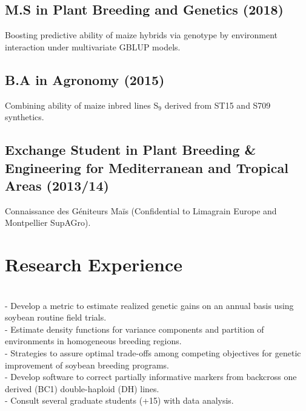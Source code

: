 \documentclass[]{deedy-resume-openfont}
\begin{document}
\begin{minipage}[t]{1\textwidth}
\subsection{M.S in Plant Breeding and Genetics (2018)}
 Boosting predictive ability of maize hybrids via genotype by environment interaction under multivariate GBLUP models.

\sectionsep
\vspace{0.2 mm}

\subsection{B.A in Agronomy (2015)}
 Combining ability of maize inbred lines S$_9$ derived from ST15 and S709 synthetics.

\sectionsep
\vspace{0.2 mm}

\subsection{Exchange Student in Plant Breeding \& Engineering for Mediterranean and Tropical Areas (2013/14)}
 Connaissance des Géniteurs Maïs (Confidential to Limagrain Europe and Montpellier SupAGro).

\sectionsep


\section{Research Experience}

\sectionsep

 \\
- Develop a metric to estimate realized genetic gains on an annual basis using soybean routine field trials. \\
- Estimate density functions for variance components and partition of environments in homogeneous breeding regions.\\
- Strategies to assure optimal trade-offs among competing objectives for genetic 
improvement of soybean breeding programs. \\
- Develop software to correct partially informative markers from backcross one derived (BC1) double-haploid (DH) lines. \\
- Consult several graduate students (+15) with data analysis.


\end{minipage}
\end{document}
